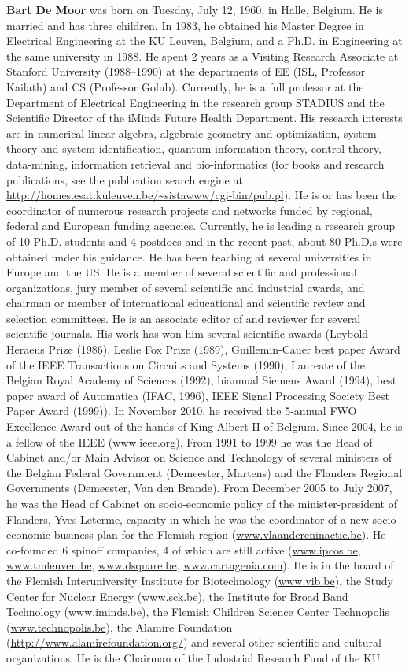 \documentclass[preprint,elsarticle-num,12pt]{elsarticle}
\begin{document}
{\noindent}\textbf{Bart De Moor} was born on Tuesday, July 12, 1960, in Halle, Belgium. He is married and has three children. In 1983, he obtained his Master Degree in Electrical Engineering at the KU Leuven, Belgium, and a Ph.D. in Engineering at the same university in 1988. He spent 2 years as a Visiting Research Associate at Stanford University (1988--1990) at the departments of EE (ISL, Professor Kailath) and CS (Professor Golub). Currently, he is a full professor at the Department of Electrical Engineering in the research group STADIUS and the Scientific Director of the iMinds Future Health Department. His research interests are in numerical linear algebra, algebraic geometry and optimization, system theory and system identification, quantum information theory, control theory, data-mining, information retrieval and bio-informatics (for books and research publications, see the publication search engine at \url{http://homes.esat.kuleuven.be/~sistawww/cgi-bin/pub.pl}). He is or has been the coordinator of numerous research projects and networks funded by regional, federal and European funding agencies. Currently, he is leading a research group of 10 Ph.D. students and 4 postdocs and in the recent past, about 80 Ph.D.s were obtained under his guidance. He has been teaching at several universities in Europe and the US. He is a member of several scientific and professional organizations, jury member of several scientific and industrial awards, and chairman or member of international educational and scientific review and selection committees. He is an associate editor of and reviewer for several scientific journals. His work has won him several scientific awards (Leybold-Heraeus Prize (1986), Leslie Fox Prize (1989), Guillemin-Cauer best paper Award of the IEEE Transactions on Circuits and Systems (1990), Laureate of the Belgian Royal Academy of Sciences (1992), biannual Siemens Award (1994), best paper award of Automatica (IFAC, 1996), IEEE Signal Processing Society Best Paper Award (1999)). In November 2010, he received the 5-annual FWO Excellence Award out of the hands of King Albert II of Belgium. Since 2004, he is a fellow of the IEEE (www.ieee.org). From 1991 to 1999 he was the Head of Cabinet and/or Main Advisor on Science and Technology of several ministers of the Belgian Federal Government (Demeester, Martens) and the Flanders Regional Governments (Demeester, Van den Brande). From December 2005 to July 2007, he was the Head of Cabinet on socio-economic policy of the minister-president of Flanders, Yves Leterme, capacity in which he was the coordinator of a new socio-economic business plan for the Flemish region (\url{www.vlaandereninactie.be}). He co-founded 6 spinoff companies, 4 of which are still active (\url{www.ipcos.be}, \url{www.tmleuven.be}, \url{www.dsquare.be}, \url{www.cartagenia.com}). He is in the board of the Flemish Interuniversity Institute for Biotechnology (\url{www.vib.be}), the Study Center for Nuclear Energy (\url{www.sck.be}), the Institute for Broad Band Technology (\url{www.iminds.be}), the Flemish Children Science Center Technopolis (\url{www.technopolis.be}), the Alamire Foundation (\url{http://www.alamirefoundation.org/}) and several other scientific and cultural organizations. He is the Chairman of the Industrial Research Fund of the KU 
\end{document}
